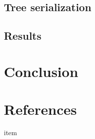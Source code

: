 \documentclass[11pt, oneside]{article}
\begin{document}

\subsection{Tree serialization}


\subsection{Results}


\section{Conclusion}


\section{References}

\noindent

\begin{description}

\item item

\end{description}
\end{document}

